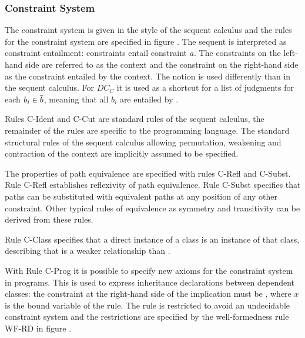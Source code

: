 \subsubsection{Constraint System}
The constraint system is given in the style of the sequent calculus
and the rules for the constraint system are specified in figure .
The sequent  is interpreted as constraint entailment:
constraints  entail constraint $a$.
The constraints on the left-hand side are referred to as the context
and the constraint on the right-hand side as the constraint entailed by the context.
The notion  is used differently than in the sequent calculus.
For $DC_C$ it is used as a shortcut for a list of judgments
 for each $b_i \in \overline{b}$,
meaning that all $b_i$ are entailed by .

Rules C-Ident and C-Cut are standard rules of the sequent calculus,
the remainder of the rules are specific to the programming language.
The standard structural rules of the sequent calculus allowing
permutation, weakening and contraction of the context
are implicitly assumed to be specified.

The properties of path equivalence are specified with rules C-Refl and C-Subst.
Rule C-Refl establishes reflexivity of path equivalence.
Rule C-Subst specifies that paths can be substituted with equivalent paths
at any position of any other constraint.
Other typical rules of equivalence as symmetry and transitivity can be
derived from these rules.

Rule C-Class specifies that a direct instance of a class
is an instance of that class, describing that
 is a weaker relationship than .

With Rule C-Prog it is possible to specify new axioms for the constraint system in programs.
This is used to express inheritance declarations between dependent classes:
the constraint at the right-hand side of the implication must be ,
where $x$ is the bound variable of the rule.
The rule is restricted to avoid an undecidable constraint system
and the restrictions are specified by the well-formedness rule WF-RD in figure .

